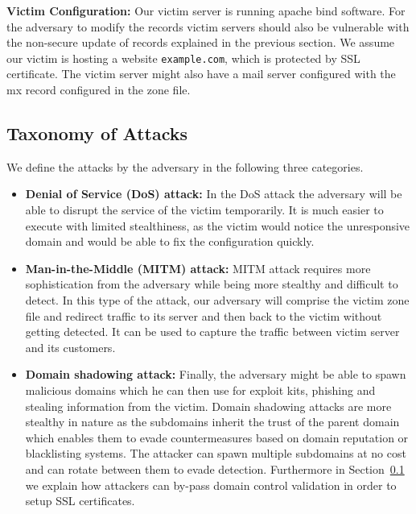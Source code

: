 \textbf{Victim Configuration:} Our victim server is running apache bind software. For the adversary to modify the records victim servers should also be vulnerable with the non-secure update of records explained in the previous section. We assume our victim is hosting a website \texttt{example.com}, which is protected by SSL certificate. The victim server might also have a mail server configured with the mx record configured in the zone file.  


\subsection{Taxonomy of Attacks}
We define the attacks by the adversary in the following three categories. 

\begin{itemize}
\item \textbf{Denial of Service (DoS) attack:} In the DoS attack the adversary will be able to disrupt the service of the victim temporarily. It is much easier to execute with limited stealthiness, as the victim would notice the unresponsive domain and would be able to fix the configuration quickly. 


\item \textbf{Man-in-the-Middle (MITM) attack:} MITM attack requires more sophistication from the adversary while being more stealthy and difficult to detect. In this type of the attack, our adversary will comprise the victim zone file and redirect traffic to its server and then back to the victim without getting detected. It can be used to capture the traffic between victim server and its customers.  

\item \textbf{Domain shadowing attack:} Finally, the adversary might be able to spawn malicious domains which he can then use for exploit kits, phishing and stealing information from the victim. Domain shadowing attacks are more stealthy in nature as the subdomains inherit the trust of the parent domain which enables them to evade countermeasures based on domain reputation or blacklisting systems. The attacker can spawn multiple subdomains at no cost and can rotate between them to evade detection. Furthermore in Section~\ref{} we explain how attackers can by-pass domain control validation in order to setup SSL certificates. 
\end{itemize}



